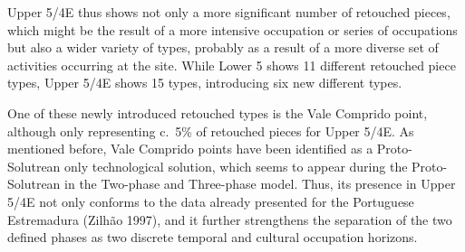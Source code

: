 \documentclass[12pt,twoside]{reedthesis}
\begin{document}
Upper 5/4E thus shows not only a more significant number of retouched pieces, which might be the result of a more intensive occupation or series of occupations but also a wider variety of types, probably as a result of a more diverse set of activities occurring at the site. While Lower 5 shows 11 different retouched piece types, Upper 5/4E shows 15 types, introducing six new different types.

One of these newly introduced retouched types is the Vale Comprido point, although only representing c.~5\% of retouched pieces for Upper 5/4E. As mentioned before, Vale Comprido points have been identified as a Proto-Solutrean only technological solution, which seems to appear during the Proto-Solutrean in the Two-phase and Three-phase model. Thus, its presence in Upper 5/4E not only conforms to the data already presented for the Portuguese Estremadura (Zilhão 1997), and it further strengthens the separation of the two defined phases as two discrete temporal and cultural occupation horizons.
\end{document}
